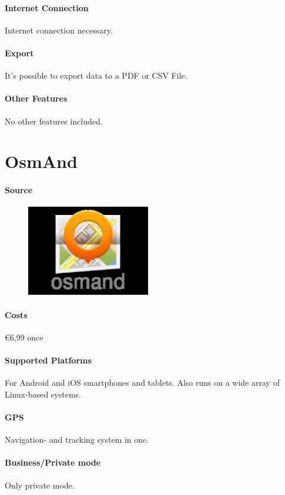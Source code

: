 \paragraph{Internet Connection} Internet connection necessary.
\paragraph{Export} It’s possible to export data to a PDF or CSV File.
\paragraph{Other Features} No other features included.
\newpage

\section{OsmAnd}
\paragraph{Source}
\begin{figure}
  \begin{center}
    \includegraphics[width=0.48\textwidth]{osmand}
  \end{center}
\end{figure} 
\paragraph{Costs} \euro 6,99 once
\paragraph{Supported Platforms} For Android and iOS smartphones and tablets. Also runs on a wide array of Linux-based systems.
\paragraph{GPS} Navigation- and tracking  system in one.
\paragraph{Business/Private mode} Only private mode.
